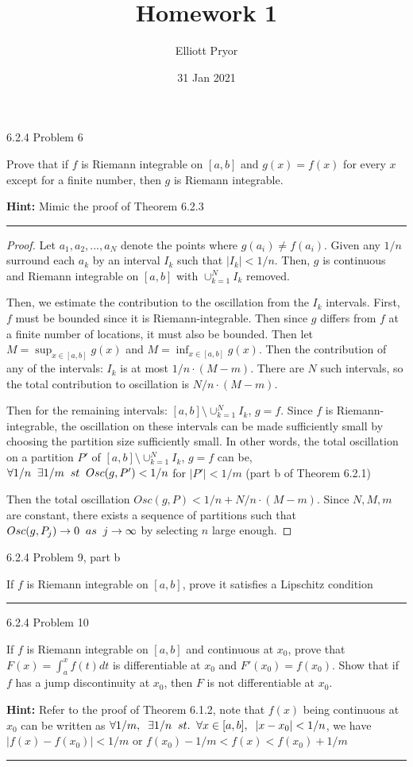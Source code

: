 \documentclass[11pt]{article}
\title{Homework 1}
\author{Elliott Pryor}
\date{31 Jan 2021}
\begin{document}
\maketitle

 6.2.4 Problem 6

Prove that if $f$ is Riemann integrable on $[a, b]$ and $g(x) = f(x)$ for
every $x$ except for a finite number, then $g$ is Riemann integrable.

\textbf{Hint:} Mimic the proof of Theorem 6.2.3

\hrule

\begin{proof}
    
    Let $a_1, a_2, ..., a_N$ denote the points where $g(a_i) \neq f(a_i)$.
    Given any $1/n$ surround each $a_k$ by an interval $I_k$ such that $|I_k| < 1/n$. Then,
    $g$ is continuous and Riemann integrable on $[a,b]$ with $\cup_{k = 1} ^N I_k$ removed.

    Then, we estimate the contribution to the oscillation from the $I_k$ intervals. First, $f$ must be bounded since
    it is Riemann-integrable. Then since $g$ differs from $f$ at a finite number of locations, it must also be bounded. 
    Then let $M = \sup _{x \in [a,b]} g(x)$ and $M = \inf _{x \in [a,b]} g(x)$. Then the contribution of any of the intervals:
    $I_k$ is at most $1/n \cdot (M-m)$. There are $N$ such intervals, so the total contribution to oscillation is $N/n \cdot (M - m)$.

    Then for the remaining intervals: $[a,b] \setminus \cup_{k = 1} ^N I_k$, $g = f$. Since $f$ is Riemann-integrable,
    the oscillation on these intervals can be made sufficiently small by choosing the partition size sufficiently small. 
    In other words, the total oscillation on a partition $P'$ of $[a,b] \setminus \cup_{k = 1} ^N I_k$, $g = f$ can be,
    $\forall 1/n \sp \exists 1/m \sp st \sp Osc(g, P') < 1/n$ for $|P'| < 1/m$ (part b of Theorem 6.2.1)

    Then the total oscillation $Osc(g, P) < 1/n + N/n \cdot (M - m)$. Since $N, M, m$ are constant, there exists a sequence of 
    partitions such that $Osc(g, P_j) \to 0 \sp as \sp j \to \infty$ by selecting $n$ large enough.


\end{proof}



 6.2.4 Problem 9, part b

If $f$ is Riemann integrable on $[a, b]$, prove it satisfies a Lipschitz condition

\hrule




 6.2.4 Problem 10

If $f$ is Riemann integrable on $[a, b]$ and continuous at $x_0$, prove
that $F(x) = \int_a ^x f(t) dt$ is differentiable at $x_0$ and $F'(x_0) = f(x_0)$.
Show that if $f$ has a jump discontinuity at $x_0$, then $F$ is not
differentiable at $x_0$. 

\textbf{Hint: } Refer to the proof of Theorem 6.1.2, note that $f(x)$ being continuous at $x_0$
can be written as $\forall 1/m, \sp \exists 1/n \sp st. \sp \forall x \in [a,b], \sp |x - x_0| < 1/n$, we have $|f(x) - f(x_0)| < 1/m$
or $f(x_0) - 1/m < f(x) < f(x_0) + 1/m$
\hrule
\end{document}
